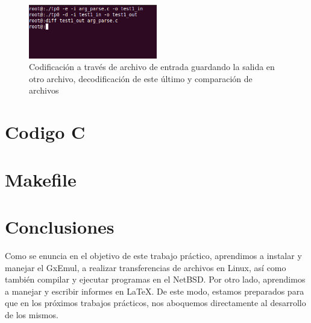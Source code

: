 \documentclass[a4paper,10pt,oneside]{article}
\newcommand{\captionlisting}[2][]{%
}
\begin{document}
	\begin{figure}[H]
		\begin{center}
			\includegraphics[width=0.50\textwidth]{test4.png}
		\end{center}
		\caption{Codificación a través de archivo de entrada guardando la salida en otro archivo, decodificación de este último y comparación de archivos} \label{Figura 4}
	\end{figure}
	
	\newpage
\appendix
\section{Codigo C}

\captionlisting{../arg_parse.h}
\captionlisting{../arg_parse.c}

\captionlisting{../base_64.h}
\captionlisting{../base_64.c}

\captionlisting{../main.c}
\newpage
\section{Makefile}



\newpage
\section{Conclusiones}	
	Como se enuncia en el objetivo de este trabajo práctico, aprendimos a instalar y manejar el GxEmul, a realizar transferencias de archivos en Linux, así como también compilar y ejecutar programas en el NetBSD. Por otro lado,  aprendimos a manejar y escribir informes en \LaTeX{}.
	De este modo, estamos preparados para que en los próximos trabajos prácticos, nos aboquemos directamente al desarrollo de los mismos.
\end{document}
